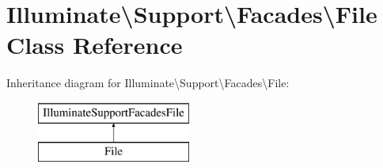 \hypertarget{class_illuminate_1_1_support_1_1_facades_1_1_file}{}\section{Illuminate\textbackslash{}Support\textbackslash{}Facades\textbackslash{}File Class Reference}
\label{class_illuminate_1_1_support_1_1_facades_1_1_file}
Inheritance diagram for Illuminate\textbackslash{}Support\textbackslash{}Facades\textbackslash{}File\+:\begin{figure}[H]
\begin{center}
\leavevmode
\includegraphics[height=2.000000cm]{class_illuminate_1_1_support_1_1_facades_1_1_file}
\end{center}
\end{figure}
